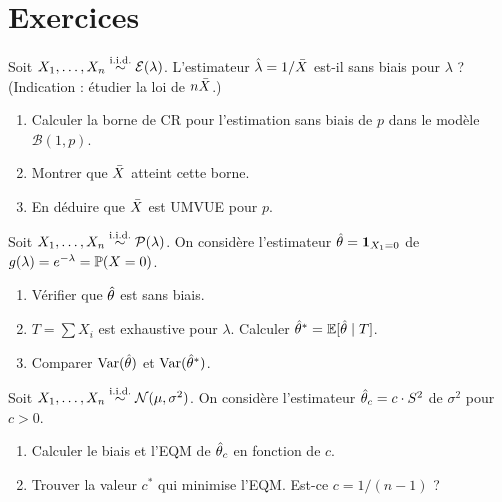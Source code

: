 \section{Exercices}

\begin{exercice}
Soit $X_1,\ldots,X_n\overset{\text{i.i.d.}}{\sim}\mathcal{E}(\lambda)$. L'estimateur $\hat{\lambda}=1/\bar{X}$ est-il sans biais pour $\lambda$ ? (Indication : \'etudier la loi de $n\bar{X}$.)
\end{exercice}

\begin{exercice}
\begin{enumerate}
\item Calculer la borne de CR pour l'estimation sans biais de $p$ dans le mod\`ele $\mathcal{B}(1,p)$.
\item Montrer que $\bar{X}$ atteint cette borne.
\item En d\'eduire que $\bar{X}$ est UMVUE pour $p$.
\end{enumerate}
\end{exercice}

\begin{exercice}
Soit $X_1,\ldots,X_n\overset{\text{i.i.d.}}{\sim}\mathcal{P}(\lambda)$. On consid\`ere l'estimateur $\hat{\theta}=\mathbf{1}_{X_1=0}$ de $g(\lambda)=e^{-\lambda}=\mathbb{P}(X=0)$.
\begin{enumerate}
\item V\'erifier que $\hat{\theta}$ est sans biais.
\item $T=\sum X_i$ est exhaustive pour $\lambda$. Calculer $\hat{\theta}^*=\mathbb{E}[\hat{\theta}\mid T]$.
\item Comparer $\operatorname{Var}(\hat{\theta})$ et $\operatorname{Var}(\hat{\theta}^*)$.
\end{enumerate}
\end{exercice}

\begin{exercice}
Soit $X_1,\ldots,X_n\overset{\text{i.i.d.}}{\sim}\mathcal{N}(\mu,\sigma^2)$. On consid\`ere l'estimateur $\hat{\theta}_c = c\cdot S^2$ de $\sigma^2$ pour $c>0$.
\begin{enumerate}
\item Calculer le biais et l'EQM de $\hat{\theta}_c$ en fonction de $c$.
\item Trouver la valeur $c^*$ qui minimise l'EQM. Est-ce $c=1/(n-1)$ ?
\end{enumerate}
\end{exercice}

